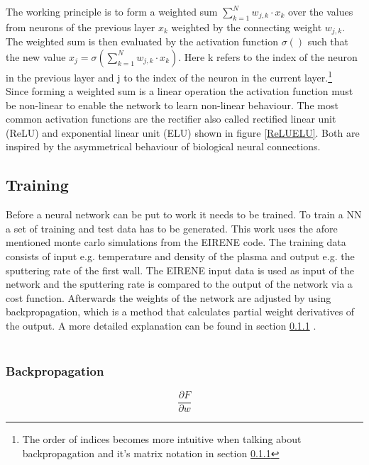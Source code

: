 			The working principle is to form a weighted sum $\sum_{k=1}^{N} w_{j,k} \cdot x_{k}$ over the values from neurons of the previous layer $x_{k}$ weighted by the connecting weight $w_{j,k}$. The weighted sum is then evaluated by the activation function $\sigma()$ such that the new value $x_j = \sigma(\sum_{k=1}^{N} w_{j,k} \cdot x_{k})$. Here k refers to the index of the neuron in the previous layer and j to the index of the neuron in the current layer.\footnote{The order of indices becomes more intuitive when talking about backpropagation and it's matrix notation in section \ref{BackProp}}\\
			Since forming a weighted sum is a linear operation the activation function must be non-linear to enable the network to learn non-linear behaviour. The most common activation functions are the rectifier also called rectified linear unit (ReLU) and exponential linear unit (ELU) shown in figure \ref{ReLUELU}. Both are inspired by the asymmetrical behaviour of biological neural connections.\\
		
		\subsection{Training}
			Before a neural network can be put to work it needs to be trained. To train a NN a set of training and test data has to be generated. This work uses the afore mentioned monte carlo simulations from the EIRENE code.
			The training data consists of input e.g. temperature and density of the plasma and output e.g. the sputtering rate of the first wall. The EIRENE input data is used as input of the network and the sputtering rate is compared to the output of the network via a cost function. Afterwards the weights of the network are adjusted by using backpropagation, which is a method that calculates partial weight derivatives of the output. A more detailed explanation can be found in section \ref{BackProp} .\\
			
			~\\
			\subsubsection{Backpropagation}
				\label{BackProp}
				\begin{equation}
					\frac{\partial F}{\partial w}
				\end{equation}
			
